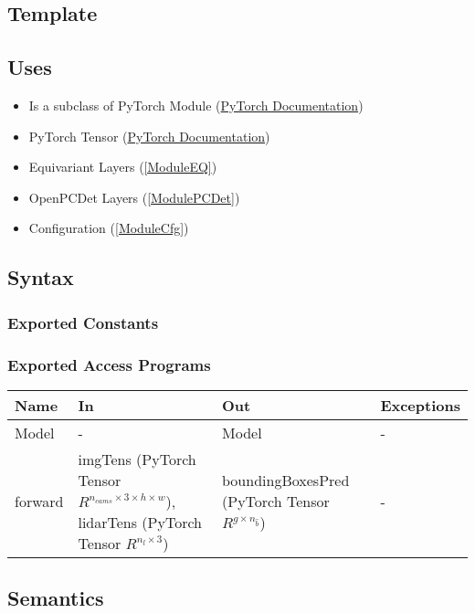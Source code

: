 \documentclass[12pt, titlepage]{article}
\begin{document}
\subsection{Template}

\subsection{Uses}
\begin{itemize}
  \item Is a subclass of PyTorch Module (\href{https://pytorch.org/docs/stable/generated/torch.nn.Module.html}{PyTorch Documentation})
  \item PyTorch Tensor (\href{https://pytorch.org/docs/stable/tensors.html}{PyTorch Documentation})
  \item Equivariant Layers (\ref{ModuleEQ})
  \item OpenPCDet Layers (\ref{ModulePCDet})
  \item Configuration (\ref{ModuleCfg})
\end{itemize}

\subsection{Syntax}

\subsubsection{Exported Constants}

\subsubsection{Exported Access Programs}

\begin{center}
  \begin{tabular}{p{2cm}|p{4cm}|p{4cm}|p{2cm}}
  \hline
  \textbf{Name} & \textbf{In} & \textbf{Out} & \textbf{Exceptions} \\
  \hline
  Model & - & Model & - \\
  \hline
  forward & imgTens (PyTorch Tensor $R^{n_{cams}\times{}3\times{}h\times{}w}$), lidarTens (PyTorch Tensor $R^{n_{l}\times{}3}$) & boundingBoxesPred (PyTorch Tensor $R^{g\times{}n_{\hat{b}}}$) & - \\
  \hline
  \end{tabular}
\end{center}

\subsection{Semantics}
\end{document}
